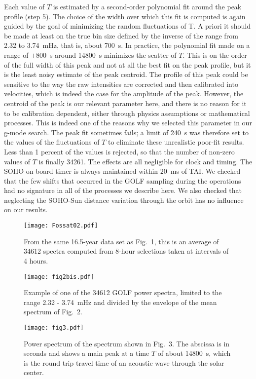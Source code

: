 \documentclass[bibyear]{aa}
\begin{document}
  Each value of $T$ is estimated by a second-order polynomial fit around the peak profile (step 5). The choice of the width over which this fit is computed is again guided by the goal of minimizing the random fluctuations of T. A priori it should be made at least on the true bin size defined by the inverse of the range from 2.32 to 3.74~mHz, that is, about 700~s. In practice, the polynomial fit  made on a range of $\pm 800$~s  around 14800~s minimizes the scatter of $T$.  This is on the order of the full width of this peak and not at all the best fit on the peak profile, but it is the least noisy estimate of the peak centroid. The profile of this peak could be sensitive to the way the raw intensities are corrected and then calibrated into velocities, which is indeed the case for the amplitude of the peak. However, the centroid of the peak is our relevant parameter
here, and there is no reason for it to be calibration dependent, either through physics assumptions or mathematical processes. This is indeed one of the reasons why we selected this parameter in our g-mode search.  The peak fit sometimes fails; a limit of 240~s was therefore set to the values of the fluctuations of $T$ to eliminate these unrealistic poor-fit results. Less
than 1 percent of the values is rejected, so that the number of non-zero values of $T$ is finally 34261. The effects are all negligible for clock
and timing. The SOHO on board timer is always maintained within 20~ms of TAI. We checked that the few shifts that occurred in the GOLF sampling during the operations had no signature in all of the processes we describe here. We also checked that neglecting the SOHO-Sun distance variation through the orbit has no influence on our results.
\begin{figure}
\centering
\texttt{[image: Fossat02.pdf]}
\caption{From the same 16.5-year data set as Fig.~1, this is an average of 34612 spectra computed from 8-hour selections taken at intervals of 4 hours.}
\label{fig:av_spec}
\end{figure} 

\begin{figure}
\centering
\texttt{[image: fig2bis.pdf]}
\caption{Example of one of the 34612 GOLF power spectra, limited to the range 2.32 - 3.74~mHz and divided by the envelope of the mean spectrum of Fig.~2.}
\label{fig:ps_example}
\end{figure} 

\begin{figure}
\centering
\texttt{[image: fig3.pdf]}
\caption{Power spectrum of the spectrum shown in Fig.~3. The abscissa is in seconds and shows a main peak at a time $T$ of about 14800~s, which is the round trip travel time of an acoustic wave through the solar center. }
\label{fig:ps_of_ps}
\end{figure} 
\end{document}
